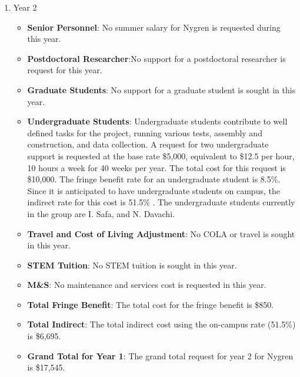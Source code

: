 \begin{enumerate}
\begin{itemize}
\end{itemize}

\item{Year 2}
\begin{itemize}[noitemsep,nolistsep]
\item{{\bf Senior Personnel}: No summer salary for Nygren is requested during this year.}

\item {{\bf Postdoctoral Researcher}:No support for a postdoctoral researcher is request for this year.} 

\item{{\bf Graduate Students}: No support for a graduate student is sought in this year.}

\item {{\bf Undergraduate Students}: Undergraduate students contribute to well defined tasks for the project, running various tests, assembly and construction, and data collection.  A request for two undergraduate support is requested at the base rate \$5,000, equivalent to \$12.5 per hour, 10 hours a week for 40 weeks per year.  The total cost for this request is \$10,000.  The fringe benefit rate for an undergraduate student is 8.5\%.  Since it is anticipated to have undergraduate students on campus, the indirect rate for this cost is 51.5\% .  The undergraduate students currently in the group are I. Safa, and N. Davachi.}

\item{{\bf Travel and Cost of Living Adjustment}: No COLA or travel is sought in this year.}

\item {{\bf STEM Tuition}: No STEM tuition is sought in this year.}

\item {{\bf M\&S}: No maintenance and services cost is requested in this year.}

\item {{\bf Total Fringe Benefit}: The total cost for the fringe benefit is \$850.}

\item {{\bf Total Indirect}: The total indirect cost using the on-campus rate (51.5\%) is \$6,695.}

\item {{\bf Grand Total for Year 1}: The grand total request for year 2 for Nygren is \$17,545.}

\end{itemize}


\end{enumerate}
